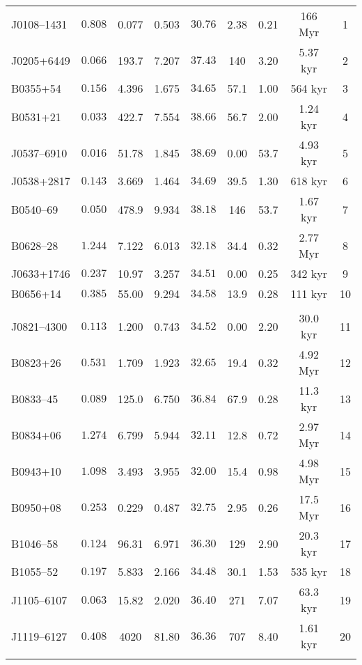 \begin{table*}
\begin{center}
\begin{tabular}{|l|c|c|c|c|c|c|c|c|}
        {\color{red}J0108--1431}  &   $0.808$  &  0.077  &  0.503  &   $30.76$  &  2.38  &  0.21  &  166 Myr &  1  \\
        J0205+6449  &   $0.066$  &  193.7  &  7.207  &   $37.43$  &  140  &  3.20  &  5.37 kyr &  2  \\
        {\color{red}B0355+54}  &   $0.156$  &  4.396  &  1.675  &   $34.65$  &  57.1  &  1.00  &  564 kyr &  3  \\
        B0531+21  &   $0.033$  &  422.7  &  7.554  &   $38.66$  &  56.7  &  2.00  &  1.24 kyr &  4  \\
        J0537--6910  &   $0.016$  &  51.78  &  1.845  &   $38.69$  &  0.00  &  53.7  &  4.93 kyr &  5  \\
        J0538+2817  &   $0.143$  &  3.669  &  1.464  &   $34.69$  &  39.5  &  1.30  &  618 kyr &  6  \\
        B0540--69  &   $0.050$  &  478.9  &  9.934  &   $38.18$  &  146  &  53.7  &  1.67 kyr &  7  \\
        {\color{red}B0628--28}  &   $1.244$  &  7.122  &  6.013  &   $32.18$  &  34.4  &  0.32  &  2.77 Myr &  8  \\
        {\color{red}J0633+1746}  &   $0.237$  &  10.97  &  3.257  &   $34.51$  &  0.00  &  0.25  &  342 kyr &  9  \\
        B0656+14  &   $0.385$  &  55.00  &  9.294  &   $34.58$  &  13.9  &  0.28  &  111 kyr &  10  \\
        & & & & & & & & \\
            
        J0821--4300  &   $0.113$  &  1.200  &  0.743  &   $34.52$  &  0.00  &  2.20  &  30.0 kyr &  11  \\
        B0823+26  &   $0.531$  &  1.709  &  1.923  &   $32.65$  &  19.4  &  0.32  &  4.92 Myr &  12  \\
        B0833--45  &   $0.089$  &  125.0  &  6.750  &   $36.84$  &  67.9  &  0.28  &  11.3 kyr &  13  \\
        {\color{red}B0834+06}  &   $1.274$  &  6.799  &  5.944  &   $32.11$  &  12.8  &  0.72  &  2.97 Myr &  14  \\
        {\color{red}B0943+10}  &   $1.098$  &  3.493  &  3.955  &   $32.00$  &  15.4  &  0.98  &  4.98 Myr &  15  \\
        {\color{red}B0950+08}  &   $0.253$  &  0.229  &  0.487  &   $32.75$  &  2.95  &  0.26  &  17.5 Myr &  16  \\
        B1046--58  &   $0.124$  &  96.31  &  6.971  &   $36.30$  &  129  &  2.90  &  20.3 kyr &  17  \\
        B1055--52  &   $0.197$  &  5.833  &  2.166  &   $34.48$  &  30.1  &  1.53  &  535 kyr &  18  \\
        J1105--6107  &   $0.063$  &  15.82  &  2.020  &   $36.40$  &  271  &  7.07  &  63.3 kyr &  19  \\
        J1119--6127  &   $0.408$  &  4020  &  81.80  &   $36.36$  &  707  &  8.40  &  1.61 kyr &  20  \\
        & & & & & & & & \\
            

\end{tabular}
\end{center}
\end{table*}
